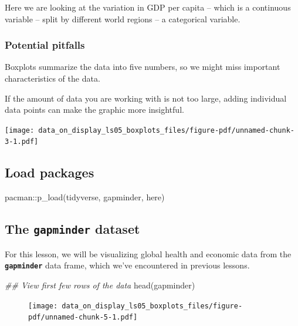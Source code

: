 \documentclass[
  letterpaper,
  DIV=11,
  numbers=noendperiod]{scrreprt}
\newenvironment{Shaded}{\begin{snugshade}}{\end{snugshade}}
\newcommand{\DocumentationTok}[1]{\textcolor[rgb]{0.37,0.37,0.37}{\textit{#1}}}
\newcommand{\FunctionTok}[1]{\textcolor[rgb]{0.28,0.35,0.67}{#1}}
\newcommand{\NormalTok}[1]{\textcolor[rgb]{0.00,0.23,0.31}{#1}}
\newcommand{\SpecialCharTok}[1]{\textcolor[rgb]{0.37,0.37,0.37}{#1}}
\begin{document}
Here we are looking at the variation in GDP per capita -- which is a
continuous variable -- split by different world regions -- a categorical
variable.

\hypertarget{potential-pitfalls}{%
\subsubsection{Potential pitfalls}\label{potential-pitfalls}}

Boxplots summarize the data into five numbers, so we might miss
important characteristics of the data.

If the amount of data you are working with is not too large, adding
individual data points can make the graphic more insightful.

\texttt{[image: data\_on\_display\_ls05\_boxplots\_files/figure-pdf/unnamed-chunk-3-1.pdf]}

\hypertarget{load-packages}{%
\subsection{Load packages}\label{load-packages}}

\begin{Shaded}
\begin{Highlighting}[]
\NormalTok{pacman}\SpecialCharTok{::}\FunctionTok{p\_load}\NormalTok{(tidyverse,}
\NormalTok{               gapminder,}
\NormalTok{               here)}
\end{Highlighting}
\end{Shaded}

\hypertarget{the-gapminder-dataset}{%
\subsection{\texorpdfstring{The \texttt{gapminder}
dataset}{The gapminder dataset}}\label{the-gapminder-dataset}}

For this lesson, we will be visualizing global health and economic data
from the \textbf{\texttt{gapminder}} data frame, which we've encountered
in previous lessons.

\begin{Shaded}
\begin{Highlighting}[]
\DocumentationTok{\#\# View first few rows of the data}
\FunctionTok{head}\NormalTok{(gapminder)}
\end{Highlighting}
\end{Shaded}

\begin{figure}[H]

{\centering \texttt{[image: data\_on\_display\_ls05\_boxplots\_files/figure-pdf/unnamed-chunk-5-1.pdf]}

}

\end{figure}
\end{document}
